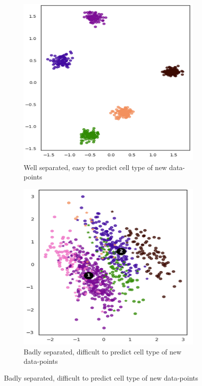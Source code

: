 \documentclass{beamer}
\begin{document}
\begin{frame}
\begin{figure}
\begin{subfigure}{.4\textwidth}
    \centering
    \includegraphics[width=.8\linewidth]{easy.png}
    \caption{\footnotesize Well separated, easy to predict cell type of new data-points}
\end{subfigure}
\begin{subfigure}{.4\textwidth}
    \centering
    \includegraphics[width=.8\linewidth]{difficult.png}
    \caption{\footnotesize Badly separated, difficult to predict cell type of new data-points}
\end{subfigure}
\end{figure}

\end{frame}
\end{document}
